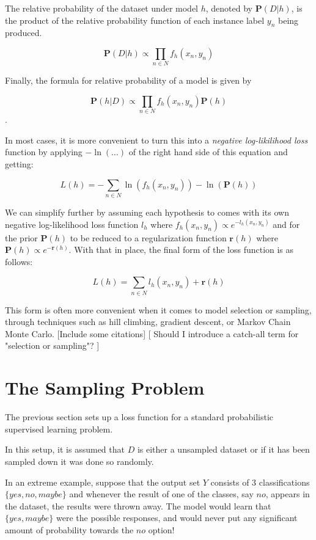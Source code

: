 \documentclass[twoside]{article}
\begin{document}
The relative probability of the dataset under model \(h\), denoted by \(\mathbf{P}(D|h)\), is the product of the relative probability function of each instance label \(y_n\) being produced.

\[\mathbf{P}(D|h)\propto \prod_{n \in N} f_h(x_n,y_n)\]

Finally, the formula for relative probability of a model is given by

\[\mathbf{P}(h|D)\propto\prod_{n \in N} f_h(x_n,y_n)\mathbf{P}(h)\].

In most cases, it is more convenient to turn this into a \textit{negative log-likilihood loss} function by applying \(-\ln(\ldots)\) of the right hand side of this equation and getting:

\[L(h)=-\sum_{n \in N} \ln(f_h(x_n,y_n))-\ln(\mathbf{P}(h))\]

We can simplify further by assuming each hypothesis to comes with its own negative log-likelihood loss function \(l_h\) where \(f_h(x_n,y_n)\propto e^{-l_h(x_n,y_n)}\) and for the prior \(\mathbf{P}(h)\) to be reduced to a regularization function \(\mathbf{r}(h)\) where \(\mathbf{P}(h)\propto e^{-\mathbf{r}(h)}\). With that in place, the final form of the loss function is as follows:

\[L(h)=\sum_{n \in N} l_h(x_n,y_n)+\mathbf{r}(h)\]

This form is often more convenient when it comes to model selection or sampling, through techniques such as hill climbing, gradient descent, or Markov Chain Monte Carlo. [Include some citations]
[ Should I introduce a catch-all term for "selection or sampling"? ]

\section{The Sampling Problem}

The previous section sets up a loss function for a standard probabilistic supervised learning problem.

In this setup, it is assumed that \(D\) is either a unsampled dataset or if it has been sampled down it was done so randomly.

In an extreme example, suppose that the output set \(Y\) consists of 3 classifications \(\{yes, no, maybe\}\) and whenever the result of one of the classes, say \(no\), appears in the dataset, the results were thrown away. The model would learn that \(\{yes, maybe\}\) were the possible responses, and would never put any significant amount of probability towards the \(no\) option!
\end{document}
